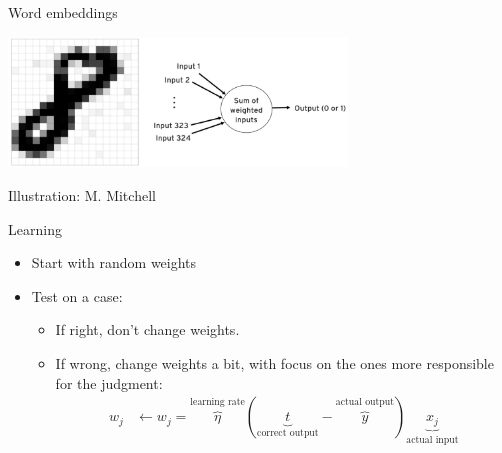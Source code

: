 \documentclass[
  10pt,
  ignorenonframetext,
  x11names, dvipsnames, bibspacing,natbib, table]{beamer}
\begin{document}
\begin{frame}{Word embeddings}
\protect\hypertarget{word-embeddings-2}{}
\begin{center}
 \includegraphics[width = 9cm]{images/perceptron1.png}
\end{center}

\vspace{-3mm}

\tiny \hfill \color{gray}Illustration: M. Mitchell \color{black}

\footnotesize

\begin{block}{Learning}
\begin{itemize}
\item Start with random weights
\item Test on a case:
\begin{itemize}
\item If right, don't change weights.
\item If wrong, change weights a bit, with focus on the ones more responsible for the judgment:
\begin{align*}
w_j & \leftarrow w_j = \overbrace{\eta}^{\text{learning rate}}(\underbrace{t}_{\text{correct output}} - \overbrace{y}^{\text{actual output}})\underbrace{x_j}_{\text{actual input}}
\end{align*}
\end{itemize}
\end{itemize}

\end{block}
\end{frame}
\end{document}
